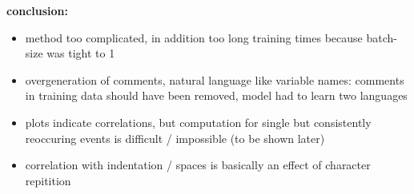 \begin{frame}{\expii}
	\textbf{conclusion:}
	\begin{itemize}
		\item method too complicated, in addition too long training times because batch-size was tight to 1		
		\item overgeneration of comments, natural language like variable names: comments in training data should have been removed, model had to learn two languages
		\item plots indicate correlations, but computation for single but consistently reoccuring events is difficult / impossible (to be shown later)
		\item correlation with indentation / spaces is basically an effect of character repitition
	\end{itemize}
\end{frame}
